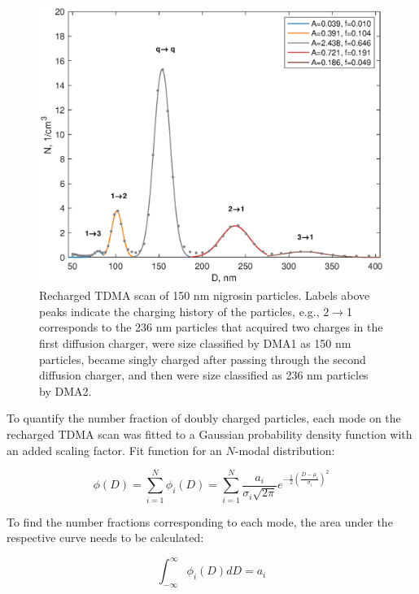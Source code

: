 \documentclass[12pt]{article}
\begin{document}
\begin{figure}[htp]
\centering
\includegraphics[scale=0.7]{fig_supp_recharged_nigrosin.eps}
\caption{Recharged TDMA scan of 150 nm nigrosin particles. Labels above peaks indicate the charging history of the particles, e.g., $2\rightarrow$1 corresponds to the 236 nm particles that acquired two charges in the first diffusion charger, were size classified by DMA1 as 150 nm particles, became singly charged after passing through the second diffusion charger, and then were size classified as 236 nm particles by DMA2.}
\label{s:fig:tdma}
\end{figure}

To quantify the number fraction of doubly charged particles, each mode on the recharged TDMA scan was fitted to a Gaussian probability density function with an added scaling factor. Fit function for an $N$-modal distribution:

\begin{equation}
    \phi(D)=\sum_{i=1}^{N}{\phi_i(D)}=\sum_{i=1}^{N}{\frac{a_i}{\sigma_i\sqrt{2\pi}}e^{-\frac{1}{2}\left(\frac{D-\mu_i}{\sigma_i}\right)^2}}
    \label{s:eq:gaussian-mode}
\end{equation}

\noindent To find the number fractions corresponding to each mode, the area under the respective curve needs to be calculated:

\begin{equation}
    \int_{-\infty}^\infty{\phi_i(D)dD}=a_i
\end{equation}
\end{document}
